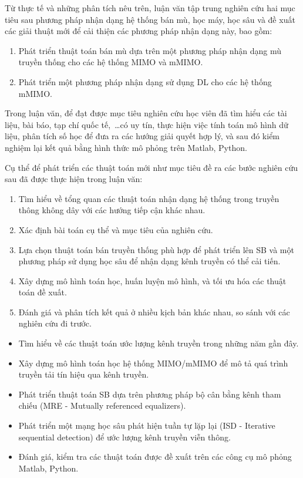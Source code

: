 Từ thực tế và những phân tích nêu trên, luận văn tập trung nghiên cứu hai mục tiêu sau phương pháp nhận dạng hệ thống bán mù, học máy, học sâu và đề xuất các giải thuật mới để cải thiện các phương pháp nhận dạng này, bao gồm:
\begin{enumerate}
    \item Phát triển thuật toán bán mù dựa trên một phương pháp nhận dạng mù truyền thống cho các hệ thống MIMO và mMIMO.
    
    \item Phát triển một phương pháp nhận dạng sử dụng DL cho các hệ thống mMIMO.
\end{enumerate}
\vspace{0.5cm}


Trong luận văn, để đạt được mục tiêu nghiên cứu học viên đã tìm hiểu các tài liệu, bài báo, tạp chí quốc tế,~\ldots có uy tín, thực hiện việc tính toán mô hình dữ liệu, phân tích số học để đưa ra các hướng giải quyết hợp lý, và sau đó kiểm nghiệm lại kết quả bằng hình thức mô phỏng trên Matlab, Python.

Cụ thể để phát triển các thuật toán mới như mục tiêu đề ra các bước nghiên cứu sau đã được thực hiện trong luận văn:

\begin{enumerate}
    \item Tìm hiểu về tổng quan các thuật toán nhận dạng hệ thống trong truyền thông không dây với các hướng tiếp cận khác nhau. 
	\item Xác định bài toán cụ thể và mục tiêu của nghiên cứu.
	\item Lựa chọn thuật toán bán truyền thống phù hợp để phát triển lên SB và một phương pháp sử dụng học sâu để nhận dạng kênh truyền có thể cải tiến.
	\item Xây dựng mô hình toán học, huấn luyện mô hình, và tối ưu hóa các thuật toán đề xuất.
	\item Đánh giá và phân tích kết quả ở nhiều kịch bản khác nhau, so sánh với các nghiên cứu đi trước.
\end{enumerate} 
\vspace{0.3cm}


\renewcommand{\labelitemi}{$-$}
\begin{itemize}
	\item Tìm hiểu về các thuật toán ước lượng kênh truyền trong những năm gần đây.
	\item Xây dựng mô hình toán học hệ thống MIMO/mMIMO để mô tả quá trình truyền tải tín hiệu qua kênh truyền.
	\item Phát triển thuật toán SB dựa trên phương pháp bộ cân bằng kênh tham chiếu (MRE - Mutually referenced equalizers).
	\item Phát triển một mạng học sâu phát hiện tuần tự lặp lại (ISD - Iterative sequential detection) để ước lượng kênh truyền viễn thông.
	\item Đánh giá, kiểm tra các thuật toán được đề xuất trên các công cụ mô phỏng Matlab, Python.
\end{itemize} 
\vspace{0.3cm}

